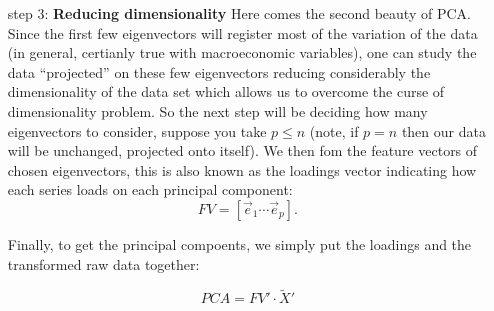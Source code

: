 \documentclass[11pt]{article}
\theoremstyle{definition}
\begin{document}
\begin{itemize}
\item[step 3:]\textbf{Reducing dimensionality}\newline
Here comes the second beauty of PCA. Since the first few eigenvectors will register most of the variation of the data (in general, certianly true with macroeconomic variables), one can study the data ``projected'' on these few eigenvectors reducing considerably the dimensionality of the data set which allows us to overcome the curse of dimensionality problem. So the next step will be deciding how many eigenvectors to consider, suppose you take $p\leq n$ (note, if $p=n$ then our data will be unchanged, projected onto itself). We then fom the feature vectors of chosen eigenvectors, this is also known as the loadings vector indicating how each series loads on each principal component: 
\begin{equation}FV = [\vec{e}_{1} \cdots \vec{e}_{p}].
\end{equation}

Finally, to get the principal compoents, we simply put the loadings and the transformed raw data together:

\begin{equation}
PCA = FV'\cdot \tilde{X}'
\end{equation}


\end{itemize}
\end{document}
